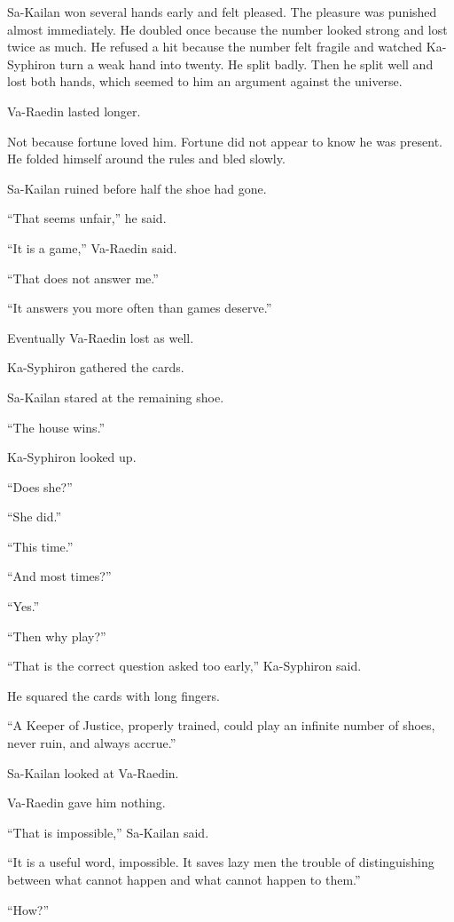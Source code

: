 Sa-Kailan won several hands early and felt pleased. The pleasure was punished almost immediately. He doubled once because the number looked strong and lost twice as much. He refused a hit because the number felt fragile and watched Ka-Syphiron turn a weak hand into twenty. He split badly. Then he split well and lost both hands, which seemed to him an argument against the universe.\par
Va-Raedin lasted longer.\par
Not because fortune loved him. Fortune did not appear to know he was present. He folded himself around the rules and bled slowly.\par
Sa-Kailan ruined before half the shoe had gone.\par
“That seems unfair,” he said.\par
“It is a game,” Va-Raedin said.\par
“That does not answer me.”\par
“It answers you more often than games deserve.”\par
Eventually Va-Raedin lost as well.\par
Ka-Syphiron gathered the cards.\par
Sa-Kailan stared at the remaining shoe.\par
“The house wins.”\par
Ka-Syphiron looked up.\par
“Does she?”\par
“She did.”\par
“This time.”\par
“And most times?”\par
“Yes.”\par
“Then why play?”\par
“That is the correct question asked too early,” Ka-Syphiron said.\par
He squared the cards with long fingers.\par
“A Keeper of Justice, properly trained, could play an infinite number of shoes, never ruin, and always accrue.”\par
Sa-Kailan looked at Va-Raedin.\par
Va-Raedin gave him nothing.\par
“That is impossible,” Sa-Kailan said.\par
“It is a useful word, impossible. It saves lazy men the trouble of distinguishing between what cannot happen and what cannot happen to them.”\par
“How?”\par
